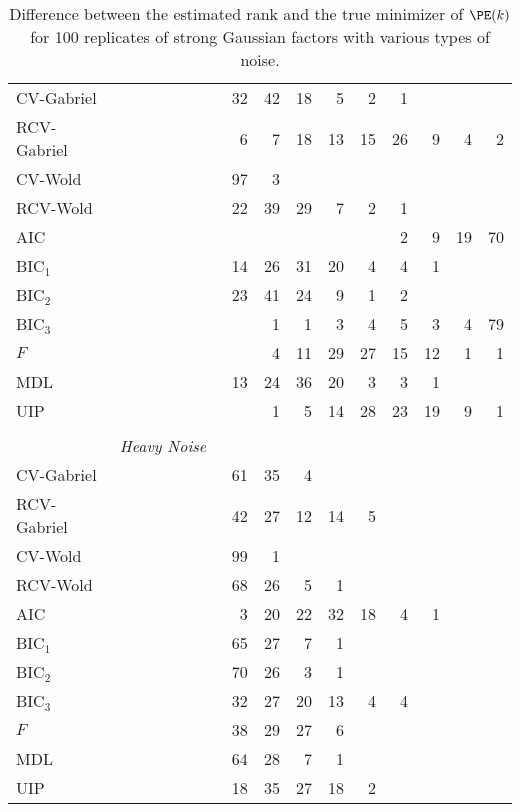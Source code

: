 \begin{table}
\begin{tabular}{lrrrrrrrrrrrrrrrr}
CV-Gabriel &  &  &  &  &  &  &  &  32 &  42 &  18 &  5 &  2 &  1 &  &  & \\ 
 RCV-Gabriel &  &  &  &  &  &  &  &  6 &  7 &  18 &  13 &  15 &  26 &  9 &  4 &  2\\ 
 CV-Wold &  &  &  &  &  &  &  &  97 &  3 &  &  &  &  &  &  & \\ 
 RCV-Wold &  &  &  &  &  &  &  &  22 &  39 &  29 &  7 &  2 &  1 &  &  & \\ 
 AIC &  &  &  &  &  &  &  &  &  &  &  &  &  2 &  9 &  19 &  70\\ 
 BIC$_1$ &  &  &  &  &  &  &  &  14 &  26 &  31 &  20 &  4 &  4 &  1 &  & \\ 
 BIC$_2$ &  &  &  &  &  &  &  &  23 &  41 &  24 &  9 &  1 &  2 &  &  & \\ 
 BIC$_3$ &  &  &  &  &  &  &  &  &  1 &  1 &  3 &  4 &  5 &  3 &  4 &  79\\ 
 $F$ &  &  &  &  &  &  &  &  &  4 &  11 &  29 &  27 &  15 &  12 &  1 &  1\\ 
 MDL &  &  &  &  &  &  &  &  13 &  24 &  36 &  20 &  3 &  3 &  1 &  & \\ 
 UIP &  &  &  &  &  &  &  &  &  1 &  5 &  14 &  28 &  23 &  19 &  9 &  1\\ 
        \\
        &\multicolumn{16}{l}{\scriptsize{\textit{Heavy Noise}}} \\
CV-Gabriel &  &  &  &  &  &  &  &  61 &  35 &  4 &  &  &  &  &  & \\ 
 RCV-Gabriel &  &  &  &  &  &  &  &  42 &  27 &  12 &  14 &  5 &  &  &  & \\ 
 CV-Wold &  &  &  &  &  &  &  &  99 &  1 &  &  &  &  &  &  & \\ 
 RCV-Wold &  &  &  &  &  &  &  &  68 &  26 &  5 &  1 &  &  &  &  & \\ 
 AIC &  &  &  &  &  &  &  &  3 &  20 &  22 &  32 &  18 &  4 &  1 &  & \\ 
 BIC$_1$ &  &  &  &  &  &  &  &  65 &  27 &  7 &  1 &  &  &  &  & \\ 
 BIC$_2$ &  &  &  &  &  &  &  &  70 &  26 &  3 &  1 &  &  &  &  & \\ 
 BIC$_3$ &  &  &  &  &  &  &  &  32 &  27 &  20 &  13 &  4 &  4 &  &  & \\ 
 $F$ &  &  &  &  &  &  &  &  38 &  29 &  27 &  6 &  &  &  &  & \\ 
 MDL &  &  &  &  &  &  &  &  64 &  28 &  7 &  1 &  &  &  &  & \\ 
 UIP &  &  &  &  &  &  &  &  18 &  35 &  27 &  18 &  2 &  &  &  & \\ 
        \bottomrule
    \end{tabular}
    \caption{
        Difference between the estimated rank and the true minimizer of 
        $\PE(k)$ for 100 replicates of strong Gaussian factors with various
        types of noise.
    }
\end{table}

